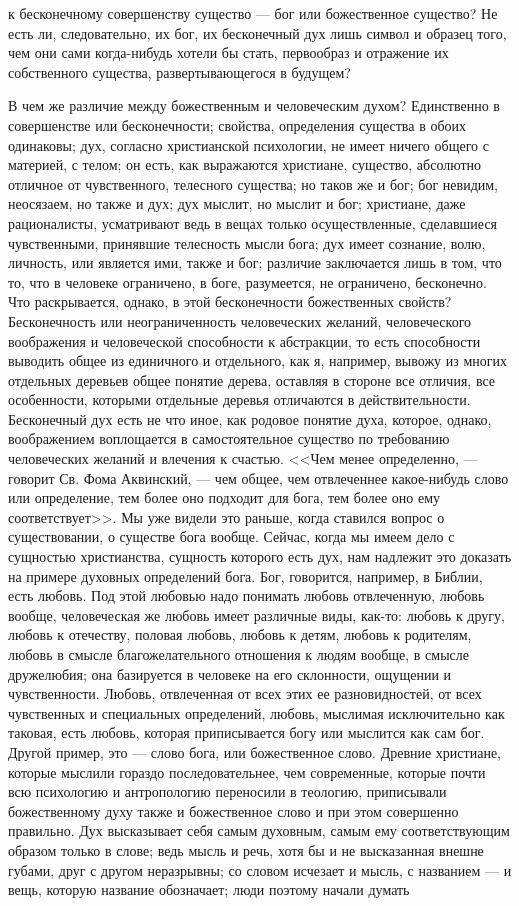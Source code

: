 \documentclass[12pt]{article}
\begin{document}
к бесконечному совершенству существо --- бог или божественное существо? Не есть ли, следовательно, их бог, их бесконечный дух лишь символ и образец того, чем они сами когда-нибудь хотели бы стать, первообраз и отражение их собственного существа, развертывающегося в будущем? 

В чем же различие между божественным и человеческим духом? Единственно в совершенстве или бесконечности; свойства, определения существа в обоих одинаковы; дух, согласно христианской психологии, не имеет ничего общего с материей, с телом; он есть, как выражаются христиане, существо, абсолютно отличное от чувственного, телесного существа; но таков же и бог; бог невидим, неосязаем, но также и дух; дух мыслит, но мыслит и бог; христиане, даже рационалисты, усматривают ведь в вещах только осуществленные, сделавшиеся чувственными, принявшие телесность мысли бога; дух имеет сознание, волю, личность, или является ими, также и бог; различие заключается лишь в том, что то, что в человеке ограничено, в боге, разумеется, не ограничено, бесконечно. Что раскрывается, однако, в этой бесконечности божественных свойств? Бесконечность или неограниченность человеческих желаний, человеческого воображения и человеческой способности к абстракции, то есть способности выводить общее из единичного и отдельного, как я, например, вывожу из многих отдельных деревьев общее понятие дерева, оставляя в стороне все отличия, все особенности, которыми отдельные деревья отличаются в действительности. Бесконечный дух есть не что иное, как родовое понятие духа, которое, однако, воображением воплощается в самостоятельное существо по требованию человеческих желаний и влечения к счастью. <<Чем менее определенно, --- говорит Св. Фома Аквинский, --- чем общее, чем отвлеченнее какое-нибудь слово или определение, тем более оно подходит для бога, тем более оно ему соответствует>>. Мы уже видели это раньше, когда ставился вопрос о существовании, о существе бога вообще. Сейчас, когда мы имеем дело с сущностью христианства, сущность которого есть дух, нам надлежит это доказать на примере духовных определений бога. Бог, говорится, например, в Библии, есть любовь. Под этой любовью надо понимать любовь отвлеченную, любовь вообще, человеческая же любовь имеет различные виды, как-то: любовь к другу, любовь к отечеству, половая любовь, любовь к детям, любовь к родителям, любовь в смысле благожелательного отношения к людям вообще, в смысле дружелюбия; она базируется в человеке на его склонности, ощущении и чувственности. Любовь, отвлеченная от всех этих ее разновидностей, от всех чувственных и специальных определений, любовь, мыслимая исключительно как таковая, есть любовь, которая приписывается богу или мыслится как сам бог. Другой пример, это --- слово бога, или божественное слово. Древние христиане, которые мыслили гораздо последовательнее, чем современные, которые почти всю психологию и антропологию переносили в теологию, приписывали божественному духу также и божественное слово и при этом совершенно правильно. Дух высказывает себя самым духовным, самым ему соответствующим образом только в слове; ведь мысль и речь, хотя бы и не высказанная внешне губами, друг с другом неразрывны; со словом исчезает и мысль, с названием --- и вещь, которую название обозначает; люди поэтому начали думать 
\end{document}

